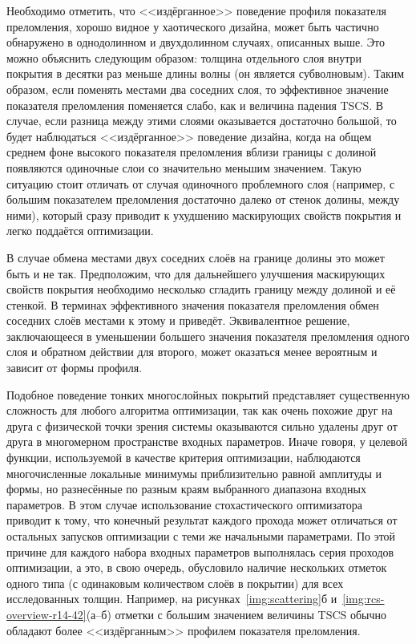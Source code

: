 Необходимо отметить, что <<издёрганное>> поведение профиля показателя
преломления, хорошо видное у хаотического дизайна, может быть
частично обнаружено в однодолинном и двухдолинном случаях,
описанных выше.  Это можно объяснить следующим образом: толщина
отдельного слоя внутри покрытия в десятки раз меньше длины волны (он
является субволновым).  Таким образом, если поменять местами два
соседних слоя, то эффективное значение показателя преломления
поменяется слабо, как и величина падения TSCS.  В случае, если разница
между этими слоями оказывается
достаточно большой, то будет наблюдаться <<издёрганное>> поведение дизайна,
 когда на общем среднем фоне высокого
показателя преломления вблизи границы с долиной появляются одиночные
слои со значительно меньшим значением.
 Такую ситуацию стоит отличать от случая одиночного
проблемного слоя (например, с большим показателем преломления
достаточно далеко от стенок долины, между ними), который сразу приводит к
ухудшению маскирующих свойств покрытия и легко поддаётся оптимизации.

В случае обмена местами двух соседних слоёв на границе долины это
может быть и не так. Предположим, что для дальнейшего улучшения
маскирующих свойств покрытия необходимо несколько сгладить границу
между долиной и её стенкой. В терминах эффективного значения
показателя преломления обмен соседних слоёв местами к этому и
приведёт. Эквивалентное решение, заключающееся в уменьшении большего
значения показателя преломления одного слоя и обратном действии для
второго, может оказаться менее вероятным и зависит от формы
профиля.

Подобное поведение тонких многослойных покрытий представляет
существенную сложность для любого алгоритма оптимизации, так как очень
похожие друг на друга с физической точки зрения системы оказываются
сильно удалены друг от друга в многомерном пространстве входных
параметров.  Иначе говоря, у целевой функции, используемой в качестве
критерия оптимизации, наблюдаются многочисленные локальные минимумы
приблизительно равной амплитуды и формы, но разнесённые по разным
краям выбранного диапазона входных параметров.  В этом случае
использование стохастического оптимизатора приводит к тому, что
конечный результат каждого прохода может отличаться от остальных
запусков оптимизации с теми же начальными параметрами.  По этой
причине для каждого набора входных параметров выполнялась серия
проходов оптимизации, а это, в свою очередь, обусловило наличие
нескольких отметок одного типа (с одинаковым количеством слоёв в
покрытии) для всех исследованных толщин. Например, на
рисунках~\ref{img:scattering}б и~\ref{img:rcs-overview-r14-42}(а--б)
отметки с большим значением величины TSCS обычно обладают более
<<издёрганным>> профилем показателя преломления.

